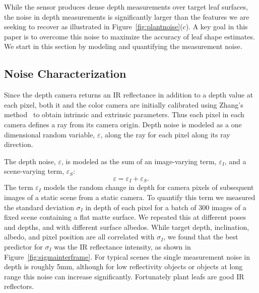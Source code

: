 \label{sec:data}


While the sensor produces dense depth measurements over target leaf surfaces, the noise in depth measurements is significantly larger than the features we are seeking to recover as illustrated in Figure~\ref{fig:plantnoise}($c$).  A key goal in this paper is to overcome this noise to maximize the accuracy of leaf shape estimates.  We start in this section by modeling and quantifying the measurement noise.



\subsection{Noise Characterization}
\label{sec:noise}

Since the depth camera returns an IR reflectance in addition to a depth value at each pixel, both it and the color camera are initially calibrated using Zhang's method~\cite{Zhang2000} to obtain intrinsic and extrinsic parameters.  Thus each pixel in each camera defines a ray from its camera origin.  Depth noise is modeled as a one dimensional random variable, $\varepsilon$, along the ray for each pixel along its ray direction.

The depth noise, $\varepsilon$, is modeled as the sum of an image-varying term, $\varepsilon_I$, and a scene-varying term, $\varepsilon_S$:
\begin{equation}
\varepsilon = \varepsilon_I + \varepsilon_S. \label{eq:epsilon}
\end{equation}
The term $\varepsilon_I$ models the random change in depth for camera pixels of subsequent images of a static scene from a static camera.  To quantify this term we measured the standard deviation $\sigma_I$ in depth of each pixel for a batch of 300 images of a fixed scene containing a flat matte surface.  We repeated this at different poses and depths, and with different surface albedos.  While target depth, inclination, albedo, and pixel position are all correlated with $\sigma_I$, we found that the best predictor for $\sigma_I$ was the IR reflectance intensity, as shown in Figure~\ref{fig:sigmainterframe}.  For typical scenes the single measurement noise in depth is roughly 5mm, although for low reflectivity objects or objects at long range this noise can increase significantly.  Fortunately plant leafs are good IR reflectors.

